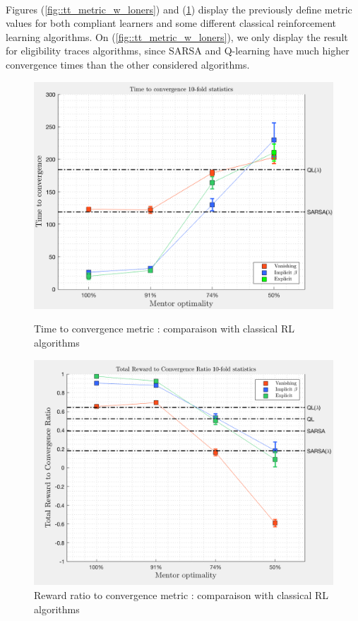 \documentclass[a4paper]{report}
\begin{document}
{{{				\paragraph{} Figures (\ref{fig::tt_metric_w_loners}) and (\ref{fig::tr_metric_w_loners}) display the previously define metric values for both compliant learners and some different classical reinforcement learning algorithms. On (\ref{fig::tt_metric_w_loners}), we only display the result for eligibility traces algorithms, since SARSA and Q-learning have much higher convergence times than the other considered algorithms. 
				
				\begin{figure}
					\begin{minipage}{0.5\linewidth}
						\includegraphics[width=\linewidth]{tt_metric_w_loners}
						\caption{Time to convergence metric : comparaison with classical RL algorithms}
						\label{fig::tt_metric_w_loners}
					\end{minipage}
					\begin{minipage}{0.5\linewidth}
						\includegraphics[width=\linewidth]{tr_metric_w_loners}
						\caption{Reward ratio to convergence metric : comparaison with classical RL algorithms}
						\label{fig::tr_metric_w_loners}
					\end{minipage}
				\end{figure}
				
}}}
\end{document}
